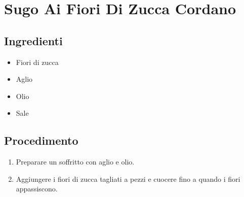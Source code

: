 \section{Sugo Ai Fiori Di Zucca Cordano}
\subsection{Ingredienti}
\begin{itemize}
\item Fiori di zucca  
\item Aglio  
\item Olio  
\item Sale
\end{itemize}
\subsection{Procedimento}
\begin{enumerate}
\item  Preparare un soffritto con aglio e olio.  
\item  Aggiungere i fiori di zucca tagliati a pezzi e cuocere fino a quando i fiori appassiscono.
\end{enumerate}
